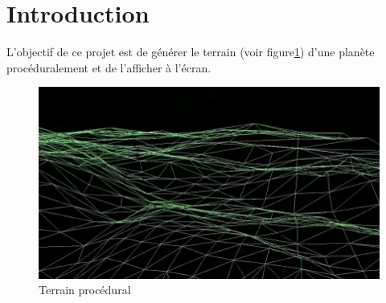 \documentclass[12pt]{report}
\begin{document}



\tableofcontents

\thispagestyle{empty} %


\newpage

\chapter*{Introduction}
\setcounter{chapter}{1}

L'objectif de ce projet est de générer le terrain (voir
figure\ref{fig:terrain})
d'une planète procéduralement et de l'afficher à l'écran.

\begin{figure}[!h]
  \includegraphics[scale=0.5]{img/terrain.png}
  \caption{Terrain procédural\protect\footnotemark}
  \label{fig:terrain}
\end{figure}
\end{document}
